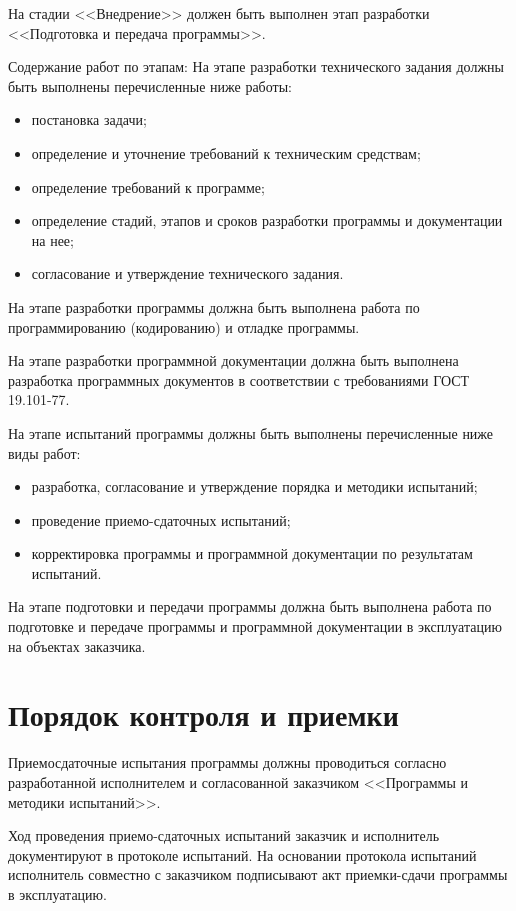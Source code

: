 \documentclass[a4page]{article}
\begin{document}
На стадии <<Внедрение>> должен быть выполнен этап разработки <<Подготовка и передача программы>>.

Содержание работ по этапам:
На этапе разработки технического задания должны быть выполнены перечисленные ниже работы:

\begin{itemize}
  \item постановка задачи;
  \item определение и уточнение требований к техническим средствам;
  \item определение требований к программе;
  \item определение стадий, этапов и сроков разработки программы и документации на нее;
  \item согласование и утверждение технического задания.
\end{itemize}

На этапе разработки программы должна быть выполнена работа по программированию (кодированию) и отладке программы.

На этапе разработки программной документации должна быть выполнена разработка программных документов в соответствии с требованиями ГОСТ 19.101-77.

На этапе испытаний программы должны быть выполнены перечисленные ниже виды работ:

\begin{itemize}
  \item разработка, согласование и утверждение порядка и методики испытаний;
  \item проведение приемо-сдаточных испытаний;
  \item корректировка программы и программной документации по результатам испытаний.
\end{itemize}

На этапе подготовки и передачи программы должна быть выполнена работа по подготовке и передаче программы и программной документации в эксплуатацию на объектах заказчика.

\section{Порядок контроля и приемки}

Приемосдаточные испытания программы должны проводиться согласно разработанной исполнителем и согласованной заказчиком <<Программы и методики испытаний>>.

Ход проведения приемо-сдаточных испытаний заказчик и исполнитель документируют в протоколе испытаний.
На основании протокола испытаний исполнитель совместно с заказчиком подписывают акт приемки-сдачи программы в эксплуатацию. 
\end{document}
